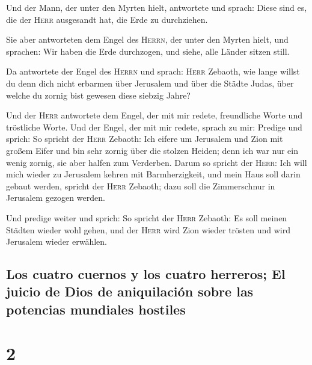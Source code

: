  Und der Mann, der unter den Myrten hielt, antwortete und
sprach: Diese sind es, die der \textsc{Herr} ausgesandt hat, die Erde zu
durchziehen.

 Sie aber antworteten dem Engel des \textsc{Herrn}, der
unter den Myrten hielt, und sprachen: Wir haben die Erde durchzogen, und
siehe, alle Länder sitzen still.

 Da antwortete der Engel des \textsc{Herrn} und sprach:
\textsc{Herr} Zebaoth, wie lange willst du denn dich nicht erbarmen über
Jerusalem und über die Städte Judas, über welche du zornig bist gewesen
diese siebzig Jahre?

 Und der \textsc{Herr} antwortete dem Engel, der mit mir
redete, freundliche Worte und tröstliche Worte.  Und der
Engel, der mit mir redete, sprach zu mir: Predige und sprich: So spricht
der \textsc{Herr} Zebaoth: Ich eifere um Jerusalem und Zion mit großem
Eifer  und bin sehr zornig über die stolzen Heiden; denn
ich war nur ein wenig zornig, sie aber halfen zum Verderben.
 Darum so spricht der \textsc{Herr}: Ich will mich wieder
zu Jerusalem kehren mit Barmherzigkeit, und mein Haus soll darin gebaut
werden, spricht der \textsc{Herr} Zebaoth; dazu soll die Zimmerschnur in
Jerusalem gezogen werden.

 Und predige weiter und sprich: So spricht der
\textsc{Herr} Zebaoth: Es soll meinen Städten wieder wohl gehen, und der
\textsc{Herr} wird Zion wieder trösten und wird Jerusalem wieder
erwählen.

\hypertarget{los-cuatro-cuernos-y-los-cuatro-herreros-el-juicio-de-dios-de-aniquilaciuxf3n-sobre-las-potencias-mundiales-hostiles}{%
\subsection{Los cuatro cuernos y los cuatro herreros; El juicio de Dios
de aniquilación sobre las potencias mundiales
hostiles}\label{los-cuatro-cuernos-y-los-cuatro-herreros-el-juicio-de-dios-de-aniquilaciuxf3n-sobre-las-potencias-mundiales-hostiles}}

\hypertarget{section-1}{%
\section{2}\label{section-1}}

